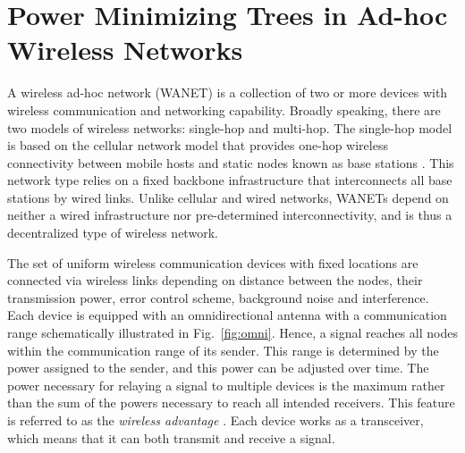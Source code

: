 \chapter{Power Minimizing Trees in Ad-hoc Wireless Networks}\label{chap:wanet}

A wireless ad-hoc network (WANET) is a collection of two or more devices with wireless communication and networking capability.
Broadly speaking, there are two models of wireless networks: single-hop and multi-hop.
The single-hop model is based on the cellular network model that provides one-hop wireless connectivity between mobile hosts and static nodes known as base stations \cite{clementi01}.
This network type relies on a fixed backbone infrastructure that interconnects all base stations by wired links.
Unlike cellular and wired networks, WANETs depend on neither a wired infrastructure nor pre-determined interconnectivity, and is thus a decentralized type of wireless network.

The set of uniform wireless communication devices with fixed locations are connected via wireless links depending on 
distance between the nodes, their transmission power, error control scheme, background noise and interference.
Each device is equipped with an omnidirectional antenna with a communication range schematically illustrated in Fig.~\ref{fig:omni}.
Hence, a signal reaches all nodes within the communication range of its sender.
This range is determined by the power assigned to the sender, and this power can be adjusted over time.
The power necessary for relaying a signal to multiple devices is the maximum rather than the sum of the powers necessary to reach all intended receivers.
This feature is referred to as the \emph{wireless advantage} \cite{wieselthier00}.
Each device works as a transceiver, which means that it can both transmit and receive a signal.

